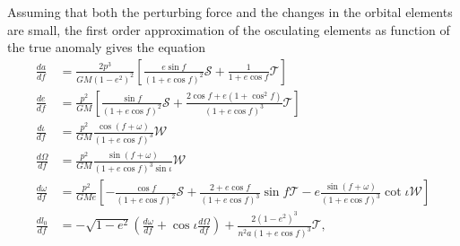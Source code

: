 Assuming that both the perturbing force and the changes in the orbital elements are small, the first order approximation of the osculating elements as function of the true anomaly gives the equation
\begin{subequations}\label{eq:OsculatingOrbitalElementsinf}
\begin{align}
\frac{da}{df} &= \frac{2p^3}{GM(1-e^2)^2} \left[ \frac{e \sin f }{(1+e \cos f)^2}\mathcal{S} + \frac{1}{1+e\cos f} \mathcal{T} \right] \\
\frac{de}{df} &= \frac{p^2}{GM} \left[ \frac{\sin f}{(1+e \cos f)^2} \mathcal{S} + \frac{2\cos f + e \left( 1 + \cos^2 f \right) }{(1 + e\cos f)^3} \mathcal{T} \right] \\
\frac{d \iota}{df} &= \frac{p^2}{GM} \frac{\cos (f+\omega)}{(1+e\cos f)^3} \mathcal{W} \\
\frac{d \Omega}{df} &= \frac{p^2}{GM} \frac{\sin (f+\omega)}{(1+e\cos f)^3 \sin \iota } \mathcal{W} \\
\frac{d\omega}{df} &=\frac{p^2}{GMe}  \left[ - \frac{\cos f}{(1+e\cos f)^2} \mathcal{S} + \frac{2+e\cos f}{(1 + e \cos f)^3} \sin f \mathcal{T} - e  \frac{\sin (f + \omega)}{(1 + e \cos f)^3} \cot \iota \mathcal{W} \right] \\
\frac{dl_0}{df} &= -\sqrt{1-e^2} \left( \frac{d\omega}{df} + \cos \iota \frac{d\Omega}{df} \right) + \frac{2 (1-e^2)^3}{n^2 a (1+e \cos f)^3} \mathcal{T}  ,
\end{align}
\end{subequations}
